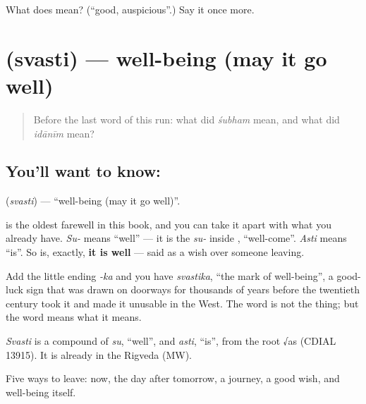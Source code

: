 \begin{tcolorbox}[breakable,colback=teal!4,colframe=teal!35!black,title={Before you move on}]
What does  mean? (\textquotedblleft{}good, auspicious\textquotedblright{}.) Say it once more.
\end{tcolorbox}
\section[\texorpdfstring{\sk{स्वस्ति} (svasti)}{स्वस्ति (svasti)}]{ (svasti) — well-being (may it go well)}

\label{lesson:SA-C28-svasti}



\begin{quote}
Before the last word of this run: what did \emph{śubham} mean, and what did \emph{idānīm} mean?
\end{quote}

\subsection*{You'll want to know: }
\textbf{} (\emph{svasti}) — \textquotedblleft{}well-being (may it go well)\textquotedblright{}.

\textbf{} is the oldest farewell in this book, and you can take it apart with what you already have. \emph{Su-} means \textquotedblleft{}well\textquotedblright{} — it is the \emph{su-} inside \textbf{}, \textquotedblleft{}well-come\textquotedblright{}. \emph{Asti} means \textquotedblleft{}is\textquotedblright{}. So  is, exactly, \textbf{it is well} — said as a wish over someone leaving.

Add the little ending \emph{-ka} and you have \emph{svastika}, \textquotedblleft{}the mark of well-being\textquotedblright{}, a good-luck sign that was drawn on doorways for thousands of years before the twentieth century took it and made it unusable in the West. The word is not the thing; but the word means what it means.

\begin{cousinweb}
\emph{Svasti} is a compound of \emph{su}, \textquotedblleft{}well\textquotedblright{}, and \emph{asti}, \textquotedblleft{}is\textquotedblright{}, from the root √as (CDIAL 13915). It is already in the Rigveda (MW).
\end{cousinweb}

\begin{grammarlens}[title={What you've built}]
Five ways to leave: now, the day after tomorrow, a journey, a good wish, and well-being itself.
\end{grammarlens}

